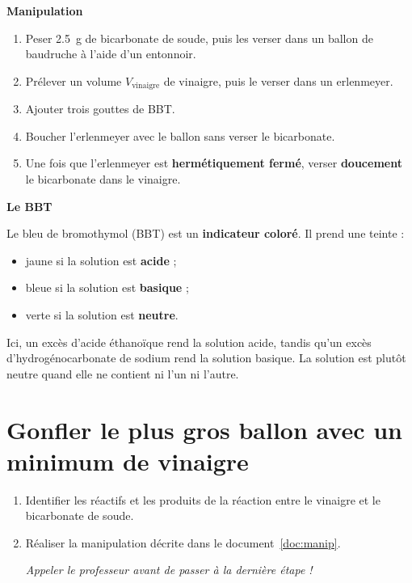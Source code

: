 \documentclass[12pt,a4paper,fleqn]{article}
\begin{document}
\begin{multicols}{2}
\begin{doc}
\label{doc:manip}
\textbf{Manipulation}

\begin{enumerate}
\item Peser \qty{2,5}{g} de bicarbonate de soude, puis les verser dans un ballon de baudruche à l'aide d'un entonnoir.
\item Prélever un volume $V_\mathrm{vinaigre}$ de vinaigre, puis le verser dans un erlenmeyer.
\item Ajouter trois gouttes de BBT.
\item Boucher l'erlenmeyer avec le ballon sans verser le bicarbonate.
\item \label{quest:manip} Une fois que l'erlenmeyer est \textbf{hermétiquement fermé}, verser \textbf{doucement} le bicarbonate dans le vinaigre.
\end{enumerate}
\end{doc}

\begin{doc}
\textbf{Le BBT}

Le bleu de bromothymol (BBT) est un \textbf{indicateur coloré}.
Il prend une teinte :
\begin{itemize}
\item \textcolor{yellow_f}{jaune} si la solution est \textbf{acide} ;
\item \textcolor{bleu_f}{bleue} si la solution est \textbf{basique} ;
\item \textcolor{green_f}{verte} si la solution est \textbf{neutre}.
\end{itemize}

Ici, un excès d'acide éthanoïque rend la solution acide, tandis qu'un excès d'hydrogénocarbonate de sodium rend la solution basique.
La solution est plutôt neutre quand elle ne contient ni l'un ni l'autre.
\end{doc}

\end{multicols}

\section*{Gonfler le plus gros ballon avec un minimum de vinaigre}

\begin{enumerate}
\item \app{}

Identifier les réactifs et les produits de la réaction entre le vinaigre et le bicarbonate de soude.

\item \rea{}
Réaliser la manipulation décrite dans le document~\ref{doc:manip}.

\emph{Appeler le professeur avant de passer à la dernière étape !}
\end{enumerate}
\end{document}
